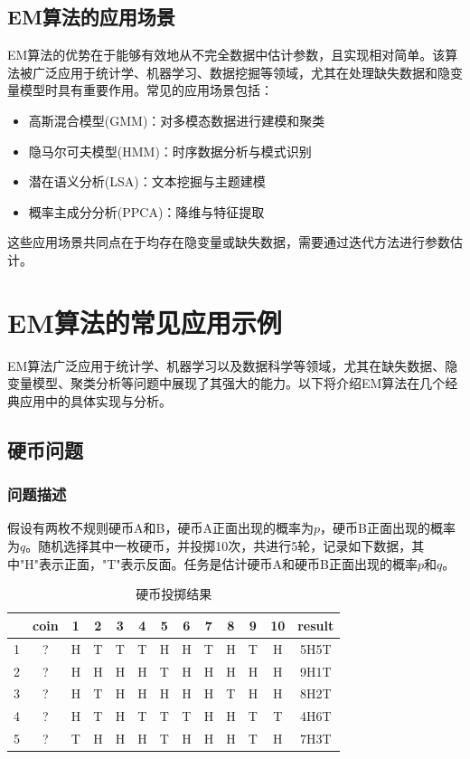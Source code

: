 \documentclass[a4paper,12pt]{ctexart} %
\begin{document}
\subsection{EM算法的应用场景}

EM算法的优势在于能够有效地从不完全数据中估计参数，且实现相对简单。该算法被广泛应用于统计学、机器学习、数据挖掘等领域，尤其在处理缺失数据和隐变量模型时具有重要作用。常见的应用场景包括：
\begin{itemize}
    \item 高斯混合模型(GMM)：对多模态数据进行建模和聚类
    \item 隐马尔可夫模型(HMM)：时序数据分析与模式识别
    \item 潜在语义分析(LSA)：文本挖掘与主题建模
    \item 概率主成分分析(PPCA)：降维与特征提取
\end{itemize}

这些应用场景共同点在于均存在隐变量或缺失数据，需要通过迭代方法进行参数估计。

\section{EM算法的常见应用示例}

EM算法广泛应用于统计学、机器学习以及数据科学等领域，尤其在缺失数据、隐变量模型、聚类分析等问题中展现了其强大的能力。以下将介绍EM算法在几个经典应用中的具体实现与分析。

\subsection{硬币问题}

\subsubsection{问题描述}
假设有两枚不规则硬币A和B，硬币A正面出现的概率为$p$，硬币B正面出现的概率为$q$。随机选择其中一枚硬币，并投掷10次，共进行5轮，记录如下数据，其中"H"表示正面，"T"表示反面。任务是估计硬币A和硬币B正面出现的概率$p$和$q$。

\begin{table}[H]
    \centering
    \caption{硬币投掷结果}
    \begin{tabular}{ccccccccccccc}
    \toprule
     & coin & 1 & 2 & 3 & 4 & 5 & 6 & 7 & 8 & 9 & 10 & result \\
    \midrule
    1 & ? & H & T & T & T & H & H & T & H & T & H & 5H5T \\
    2 & ? & H & H & H & H & T & H & H & H & H & H & 9H1T \\
    3 & ? & H & T & H & H & H & H & H & T & H & H & 8H2T \\
    4 & ? & H & T & H & T & T & T & H & H & T & T & 4H6T \\
    5 & ? & T & H & H & H & T & H & H & H & T & H & 7H3T \\
    \bottomrule
    \end{tabular}
\end{table}
\end{document}
